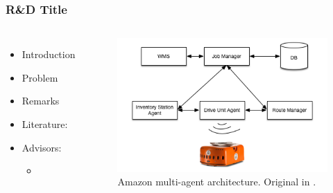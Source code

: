 \documentclass{beamer}
\begin{document}
\begin{frame}
	\frametitle{R\&D Title}

\begin{columns}[c]
\begin{itemize}
	\item Introduction 
	\item Problem
	\item Remarks
	\item Literature:
    
    \item Advisors:
    \begin{itemize}
    \item 
    \end{itemize}
\end{itemize}


\begin{figure}
\centering
        \includegraphics[width=.8\textwidth]{images/Amazon.png}
        \caption{Amazon multi-agent architecture. \tiny{Original in \cite{Wurman2014}}.}
\end{figure}

	
\end{columns}

\end{frame}

\section*{}
\end{document}
